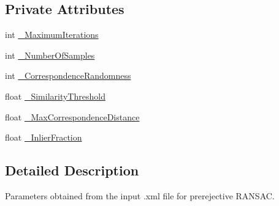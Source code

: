 \subsection*{Private Attributes}
\begin{DoxyCompactItemize}
\item 
int \hyperlink{classSampleConsensusPrerejectiveParameters_ae33e3c6665cb269e46e5cd0fe184431f}{\-\_\-\-Maximum\-Iterations}
\item 
int \hyperlink{classSampleConsensusPrerejectiveParameters_afe207e4a999ac1d22efdaa5992b107ae}{\-\_\-\-Number\-Of\-Samples}
\item 
int \hyperlink{classSampleConsensusPrerejectiveParameters_a5c00f0a8c7bff3f5e3c0ffdb79bbf9b9}{\-\_\-\-Correspondence\-Randomness}
\item 
float \hyperlink{classSampleConsensusPrerejectiveParameters_a33708a718166fa812f2b88814e5a3f8b}{\-\_\-\-Similarity\-Threshold}
\item 
float \hyperlink{classSampleConsensusPrerejectiveParameters_aa670856c820ea5bb5d71fbdc1f390856}{\-\_\-\-Max\-Correspondence\-Distance}
\item 
float \hyperlink{classSampleConsensusPrerejectiveParameters_a53fd21ee112bd21a12c2e10d5fa1faa8}{\-\_\-\-Inlier\-Fraction}
\end{DoxyCompactItemize}


\subsection{Detailed Description}
Parameters obtained from the input .xml file for prerejective R\-A\-N\-S\-A\-C. 

